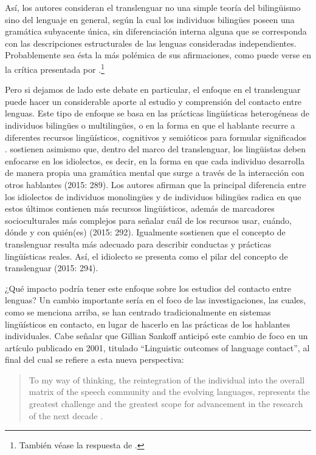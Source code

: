 \documentclass[output=paper]{langscibook}
\begin{document}
Así, los autores consideran el translenguar no una simple teoría del bilingüismo sino del lenguaje en general, según la cual los individuos bilingües poseen una gramática subyacente única, sin diferenciación interna alguna que se corresponda con las descripciones estructurales de las lenguas consideradas independientes. Probablemente sea ésta la más polémica de sus afirmaciones, como puede verse en la crítica presentada por \citet{MacSwan2017}.\footnote{También véase la respuesta de  \citet{OtheguyGarcíaReid2018}.}

Pero si dejamos de lado este debate en particular, el enfoque en el translenguar puede hacer un considerable aporte al estudio y comprensión del contacto entre lenguas. Este tipo de enfoque se basa en las prácticas lingüísticas heterogéneas de individuos bilingües o multilingües, o en la forma en que el hablante recurre a diferentes recursos lingüísticos, cognitivos y semióticos para formular significados \citep{Wei2018}. \citet{OtheguyEtAl2015} sostienen asimismo que, dentro del marco del translenguar, los lingüistas deben enfocarse en los idiolectos, es decir, en la forma en que cada individuo desarrolla de manera propia una gramática mental que surge a través de la interacción con otros hablantes (2015: 289). Los autores afirman que la principal diferencia entre los idiolectos de individuos monolingües y de individuos bilingües radica en que estos últimos contienen más recursos lingüísticos, además de marcadores socioculturales más complejos para señalar cuál de los recursos usar, cuándo, dónde y con quién(es) (2015: 292). Igualmente sostienen que el concepto de translenguar resulta más adecuado para describir conductas y prácticas lingüísticas reales. Así, el idiolecto se presenta como el pilar del concepto de translenguar (2015: 294).

¿Qué impacto podría tener este enfoque sobre los estudios del contacto entre lenguas? Un cambio importante sería en el foco de las investigaciones, las cuales, como se menciona arriba, se han centrado tradicionalmente en sistemas lingüísticos en contacto, en lugar de hacerlo en las prácticas de los hablantes individuales. Cabe señalar que Gillian Sankoff anticipó este cambio de foco en un artículo publicado en 2001, titulado “Linguistic outcomes of language contact”, al final del cual se refiere a esta nueva perspectiva: 

\begin{quote}
To my way of thinking, the reintegration of the individual into the overall matrix of the speech community and the evolving languages, represents the greatest challenge and the greatest scope for advancement in the research of the next decade \citep[659]{Sankoff2001}.
\end{quote}
\end{document}
